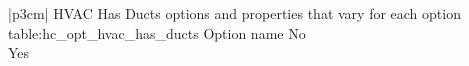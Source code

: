 \begin{customLongTable}{ |p{3cm}| }
{HVAC Has Ducts options and properties that vary for each option} {table:hc_opt_hvac_has_ducts}
{Option name}
No \\ \hline
Yes \\
\end{customLongTable}
